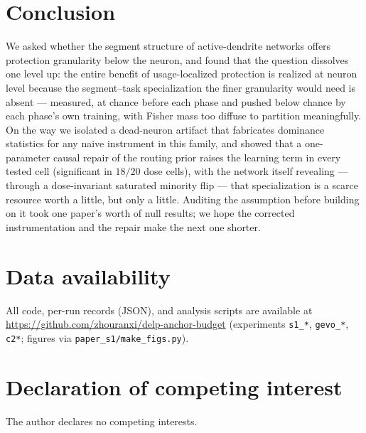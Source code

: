 \documentclass[review,12pt,number]{elsarticle}
\begin{document}
\section{Conclusion}
\label{sec:conclusion}

We asked whether the segment structure of active-dendrite networks offers
protection granularity below the neuron, and found that the question
dissolves one level up: the entire benefit of usage-localized protection is
realized at neuron level because the segment--task specialization the finer
granularity would need is absent --- measured, at chance before each phase
and pushed below chance by each phase's own training, with Fisher mass too
diffuse to partition meaningfully. On the way we isolated a dead-neuron
artifact that fabricates dominance statistics for any naive instrument in
this family, and showed that a one-parameter causal repair of the routing
prior raises the learning term in every tested cell (significant in
$18/20$ dose cells), with the network itself revealing --- through a
dose-invariant saturated minority flip --- that specialization is a scarce
resource worth a little, but only a little. Auditing the assumption before
building on it took one paper's worth of null results; we hope the
corrected instrumentation and the repair make the next one shorter.

\section*{Data availability}
All code, per-run records (JSON), and analysis scripts are available at
\url{https://github.com/zhouranxi/delp-anchor-budget} (experiments
\texttt{s1\_*}, \texttt{gevo\_*}, \texttt{c2*}; figures via
\texttt{paper\_s1/make\_figs.py}).

\section*{Declaration of competing interest}
The author declares no competing interests.



\end{document}

